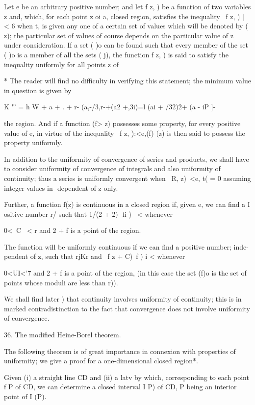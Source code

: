 Let e be an arbitrary positive number; and let f z, ) be a function of
two variables z and, which, for each point z oi a, closed region,
satisfies the inequality \ f z, ) | < 6 when t, is given any one of a
certain set of values which will be denoted by ( z); the particular
set of values of course depends on the particular value of z under
consideration. If a set ( )o can be found such that every member of
the set ( )o is a member of all the sets ( j), the function f z, ) is
said to satisfy the inequality uniformly for all points z of

* The reader will find no difficulty in verifying this statement; the
minimum value in question is given by

K "' = h W + a + . + r- (a,-/3,r-+(a2 +,3i)=l (ai + /32)2+ (a - iP ]-

%
%

the region. And if a function (f> z) possesses some property, for
every positive value of e, in virtue of the inequality \ f z, ):<e,(f)
(z) is then said to possess the property uniformly.

In addition to the uniformity of convergence of series and products,
we shall have to consider uniformity of convergence of integrals and
also uniformity of continuity; thus a series is uniformly convergent
when \ R, z)\ <e, t( = 0 assuming integer values in- dependent of z
only.

Further, a function f(z) is continuous in a closed region if, given e,
we can find a I ositive number r/ such that 1/(2 + 2) -fi ) \ <
whenever

0<\ C \ < r and 2 + f is a point of the region.

The function will be uniformly continuous if we can find a positive
number; inde- pendent of z, such that rjKr and \ f z + C)~f ) i <
whenever

0<UI<'7 and 2 + f is a point of the region, (in this case the set (f)o
is the set of points whose moduli are less than r)).

We shall find later ) that continuity involves uniformity of
continuity; this is in marked contradistinction to the fact that
convergence does not involve uniformity of convergence.

36. The modified Heine-Borel theorem.

The following theorem is of great importance in connexion with
properties of uniformity; we give a proof for a one-dimensional
closed region*.

Given (i) a straight line CD and (ii) a latv by which, corresponding
to each point f P of CD, we can determine a closed interval I P) of
CD, P being an interior point of I (P).

